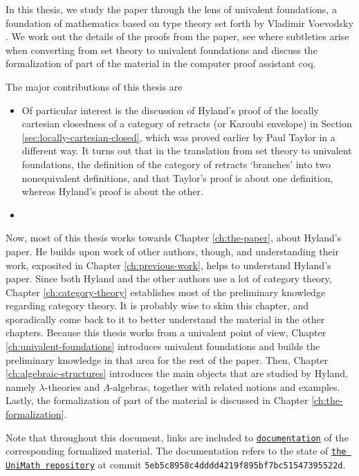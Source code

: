 In this thesis, we study the paper through the lens of univalent foundations, a foundation of mathematics based on type theory set forth by Vladimir Voevodsky \autocite{voevodsky-univalent-foundations}. We work out the details of the proofs from the paper, see where subtleties arise when converting from set theory to univalent foundations and discuss the formalization of part of the material in the computer proof assistant coq.

The major contributions of this thesis are
\begin{itemize}
  \item Of particular interest is the discussion of Hyland's proof of the locally cartesian closedness of a category of retracts (or Karoubi envelope) in Section \ref{sec:locally-cartesian-closed}, which was proved earlier by Paul Taylor in a different way. It turns out that in the translation from set theory to univalent foundations, the definition of the category of retracts `branches' into two nonequivalent definitions, and that Taylor's proof is about one definition, whereas Hyland's proof is about the other.
  \item \TODO
\end{itemize}

Now, most of this thesis works towards Chapter \ref{ch:the-paper}, about Hyland's paper.
He builds upon work of other authors, though, and understanding their work, exposited in Chapter \ref{ch:previous-work}, helps to understand Hyland's paper.
Since both Hyland and the other authors use a lot of category theory, Chapter \ref{ch:category-theory} establishes most of the preliminary knowledge regarding category theory. It is probably wise to skim this chapter, and sporadically come back to it to better understand the material in the other chapters.
Because this thesis works from a univalent point of view, Chapter \ref{ch:univalent-foundations} introduces univalent foundations and builds the preliminary knowledge in that area for the rest of the paper.
Then, Chapter \ref{ch:algebraic-structures} introduces the main objects that are studied by Hyland, namely $ \lambda $-theories and $ \Lambda $-algebras, together with related notions and examples.
Lastly, the formalization of part of the material is discussed in Chapter \ref{ch:the-formalization}.

Note that throughout this document, links are included to \href{https://arnoudvanderleer.github.io/cs-masters-thesis/toc.html}{\nolinkurl{documentation}} of the corresponding formalized material. The documentation refers to the state of \href{https://github.com/UniMath/UniMath/tree/5eb5c8958c4dddd4219f895bf7bc51547395522d}{\nolinkurl{the UniMath repository}} at commit \texttt{5eb5c8958c4dddd4219f895bf7bc51547395522d}.
